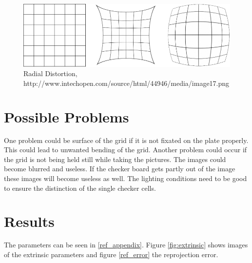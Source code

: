 \documentclass[paper=a4, fontsize=11pt]{scrartcl} %
\numberwithin{equation}{section} %
\numberwithin{figure}{section} %
\numberwithin{table}{section} %
\begin{document}
\begin{figure}[H]
	\centering
	\includegraphics[width = 0.6\linewidth]{radial.png}
	\caption{Radial Distortion, \\http://www.intechopen.com/source/html/44946/media/image17.png}
	\label{ref_radial}
\end{figure}

\section{Possible Problems}
One problem could be surface of the grid if it is not fixated on the plate properly. 
This could lead to unwanted bending of the grid.
Another problem could occur if the grid is not being held still while taking the pictures.
The images could become blurred and useless.
If the checker board gets partly out of the image these images will become useless as well.
The lighting conditions need to be good to ensure the distinction of the single checker cells.

\section{Results}

The parameters can be seen in \ref{ref_appendix}. Figure \ref{fig:extrinsic} shows images of the extrinsic parameters and figure \ref{ref_error} the reprojection error.
\end{document}
